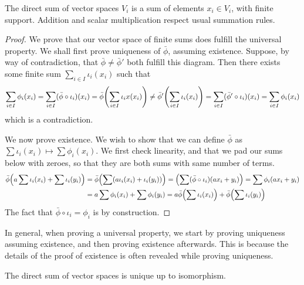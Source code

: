 \begin{theorem}
    The direct sum of vector spaces \(V_i\)
    is a sum of elements \(x_i \in V_i\), with finite support.
    Addition and scalar multiplication respect usual summation rules.
\end{theorem}
\begin{proof}
    We prove that our vector space of finite sums does fulfill the universal property.
    We shall first prove uniqueness of \(\bar{\phi}\), assuming existence.
    Suppose, by way of contradiction,
    that \(\bar{\phi} \neq \bar{\phi}'\) both fulfill this diagram.
    Then there exists some finite sum \(\sum_{i \in I} \iota_i(x_i)\) such that
    \begin{equation*}
        \sum_{i \in I} \phi_i(x_i)
        = \sum_{i \in I} (\bar{\phi}\circ\iota_i)(x_i)
        = \bar{\phi}\pqty{\sum_{i \in I} \iota_ix(x_i)}
        \neq \bar{\phi}'\pqty{\sum_{i \in I} \iota_i(x_i)}
        = \sum_{i \in I} (\bar{\phi}'\circ\iota_i)(x_i)
        = \sum_{i \in I} \phi_i(x_i)
    \end{equation*}
    which is a contradiction.

    We now prove existence.
    We wish to show that we can define \(\bar{\phi}\) as
    \(\sum \iota_i(x_i) \mapsto \sum \phi_i(x_i)\).
    We first check linearity,
    and that we pad our sums below with zeroes,
    so that they are both sums with same number of terms.
    \begin{align*}
        \bar{\phi}\pqty{a\sum \iota_i(x_i) + \sum \iota_i(y_i)}
        &= \bar{\phi}\pqty{\sum (a\iota_i(x_i)+\iota_i(y_i))}
        = \pqty{\sum (\bar{\phi}\circ\iota_i)(ax_i + y_i)}
        = \sum \phi_i(ax_i + y_i) \\
        &= a\sum \phi_i(x_i) + \sum \phi_i(y_i)
        = a\bar{\phi}\pqty{\sum \iota_i(x_i)} + \bar{\phi}\pqty{\sum \iota_i(y_i)}
    \end{align*}
    The fact that \(\bar{\phi}\circ\iota_i = \phi_i\) is by construction.
\end{proof}
\begin{remark}
    In general, when proving a universal property,
    we start by proving uniqueness assuming existence,
    and then proving existence afterwards.
    This is because the details of the proof of existence
    is often revealed while proving uniqueness.
\end{remark}
\begin{theorem}
    The direct sum of vector spaces is unique up to isomorphism.
\end{theorem}
